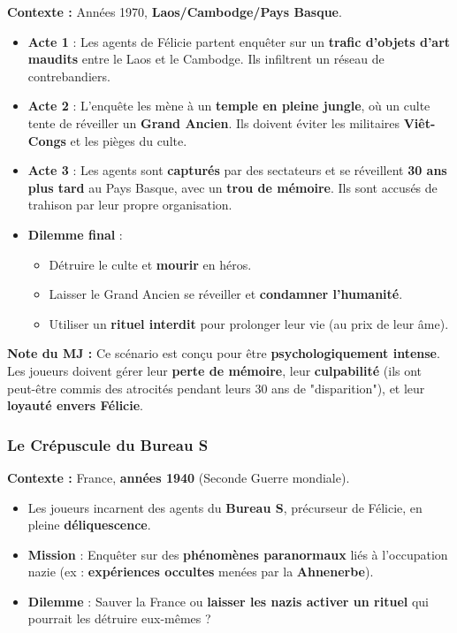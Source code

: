 \documentclass[10pt,a5paper,twoside]{book}
\begin{document}
\textbf{Contexte :} Années 1970, \textbf{Laos/Cambodge/Pays Basque}.
\begin{itemize}
	\item \textbf{Acte 1} : Les agents de Félicie partent enquêter sur un \textbf{trafic d'objets d'art maudits} entre le Laos et le Cambodge. Ils infiltrent un réseau de contrebandiers.
	\item \textbf{Acte 2} : L'enquête les mène à un \textbf{temple en pleine jungle}, où un culte tente de réveiller un \textbf{Grand Ancien}. Ils doivent éviter les militaires \textbf{Viêt-Congs} et les pièges du culte.
	\item \textbf{Acte 3} : Les agents sont \textbf{capturés} par des sectateurs et se réveillent \textbf{30 ans plus tard} au Pays Basque, avec un \textbf{trou de mémoire}. Ils sont accusés de trahison par leur propre organisation.
	\item \textbf{Dilemme final} :
	\begin{itemize}
		\item Détruire le culte et \textbf{mourir} en héros.
		\item Laisser le Grand Ancien se réveiller et \textbf{condamner l'humanité}.
		\item Utiliser un \textbf{rituel interdit} pour prolonger leur vie (au prix de leur âme).
	\end{itemize}
\end{itemize}

\begin{shaded}
\textbf{Note du MJ :} Ce scénario est conçu pour être \textbf{psychologiquement intense}. Les joueurs doivent gérer leur \textbf{perte de mémoire}, leur \textbf{culpabilité} (ils ont peut-être commis des atrocités pendant leurs 30 ans de "disparition"), et leur \textbf{loyauté envers Félicie}.
\end{shaded}

\newpage

\subsubsection{Le Crépuscule du Bureau S}

\textbf{Contexte :} France, \textbf{années 1940} (Seconde Guerre mondiale).
\begin{itemize}
	\item Les joueurs incarnent des agents du \textbf{Bureau S}, précurseur de Félicie, en pleine \textbf{déliquescence}.
	\item \textbf{Mission} : Enquêter sur des \textbf{phénomènes paranormaux} liés à l'occupation nazie (ex : \textbf{expériences occultes} menées par la \textbf{Ahnenerbe}).
	\item \textbf{Dilemme} : Sauver la France ou \textbf{laisser les nazis activer un rituel} qui pourrait les détruire eux-mêmes ?
\end{itemize}
\end{document}
